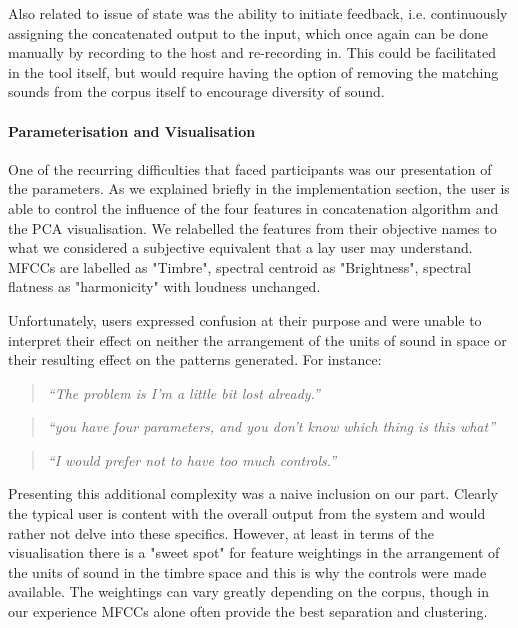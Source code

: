 Also related to issue of state was the ability to initiate feedback, i.e. continuously assigning the concatenated output to the input, which once again can be done manually by recording to the host and re-recording in. This could be facilitated in the tool itself, but would require having the option of removing the matching sounds from the corpus itself to encourage diversity of sound.

\paragraph{Parameterisation and Visualisation}

One of the recurring difficulties that faced participants was our presentation of the parameters. As we explained briefly in the implementation section, the user is able to control the influence of the four features in concatenation algorithm and the PCA visualisation. We relabelled the features from their objective names to what we considered a subjective equivalent that a lay user may understand. MFCCs are labelled as "Timbre", spectral centroid as "Brightness", spectral flatness as "harmonicity" with loudness unchanged.  

Unfortunately, users expressed confusion at their purpose and were unable to interpret their effect on neither the arrangement of the units of sound in space or their resulting effect on the patterns generated. For instance:

\blockquote{\textit{“The problem is I'm a little bit lost already.”}}

\blockquote{\textit{“you have four parameters, and you don't know which thing is this what”}}

\blockquote{\textit{“I would prefer not to have too much controls.”}}

Presenting this additional complexity was a naive inclusion on our part. Clearly the typical user is content with the overall output from the system and would rather not delve into these specifics. However, at least in terms of the visualisation there is a "sweet spot" for feature weightings in the arrangement of the units of sound in the timbre space and this is why the controls were made available. The weightings can vary greatly depending on the corpus, though in our experience MFCCs alone often provide the best separation and clustering.


